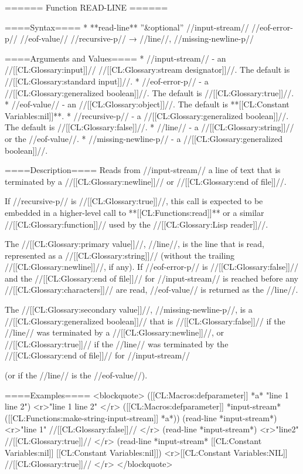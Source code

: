 ====== Function READ-LINE ======

====Syntax====
  * **read-line** ''&optional'' //input-stream// //eof-error-p// //eof-value// //recursive-p// → //line//, //missing-newline-p//

====Arguments and Values====
  * //input-stream// - an //[[CL:Glossary:input]]// //[[CL:Glossary:stream designator]]//. The default is //[[CL:Glossary:standard input]]//.
  * //eof-error-p// - a //[[CL:Glossary:generalized boolean]]//. The default is //[[CL:Glossary:true]]//.
  * //eof-value// - an //[[CL:Glossary:object]]//. The default is **[[CL:Constant Variables:nil]]**.
  * //recursive-p// - a //[[CL:Glossary:generalized boolean]]//. The default is //[[CL:Glossary:false]]//.
  * //line// - a //[[CL:Glossary:string]]// or the //eof-value//.
  * //missing-newline-p// - a //[[CL:Glossary:generalized boolean]]//.

====Description====
Reads from //input-stream// a line of text that is terminated by a //[[CL:Glossary:newline]]// or //[[CL:Glossary:end of file]]//.

If //recursive-p// is //[[CL:Glossary:true]]//, this call is expected to be embedded in a higher-level call to **[[CL:Functions:read]]** or a similar //[[CL:Glossary:function]]// used by the //[[CL:Glossary:Lisp reader]]//.

The //[[CL:Glossary:primary value]]//, //line//, is the line that is read, represented as a //[[CL:Glossary:string]]// (without the trailing //[[CL:Glossary:newline]]//, if any). If //eof-error-p// is //[[CL:Glossary:false]]// and the //[[CL:Glossary:end of file]]// for //input-stream// is reached before any //[[CL:Glossary:characters]]// are read, //eof-value// is returned as the //line//.

The //[[CL:Glossary:secondary value]]//, //missing-newline-p//, is a //[[CL:Glossary:generalized boolean]]// that is //[[CL:Glossary:false]]// if the //line// was terminated by a //[[CL:Glossary:newline]]//, or //[[CL:Glossary:true]]// if the //line// was terminated by the //[[CL:Glossary:end of file]]// for //input-stream//

(or if the //line// is the //eof-value//).

====Examples====
<blockquote> 
([[CL:Macros:defparameter]] *a* "line 1
line 2") 
<r>"line 1
line 2" </r>
([[CL:Macros:defparameter]] *input-stream* ([[CL:Functions:make-string-input-stream]] *a*))
(read-line *input-stream*) <r>"line 1"
//[[CL:Glossary:false]]// </r>
(read-line *input-stream*) <r>"line2"
//[[CL:Glossary:true]]// </r>
(read-line *input-stream* [[CL:Constant Variables:nil]] [[CL:Constant Variables:nil]]) <r>[[CL:Constant Variables:NIL]]
//[[CL:Glossary:true]]// </r>
</blockquote>

